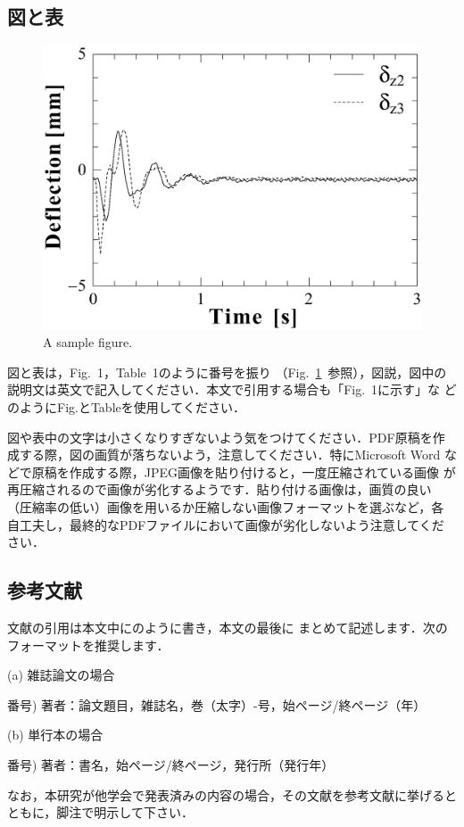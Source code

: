 \documentclass{jarticle}
\begin{document}
\subsection{図と表}

\begin{figure}[t]
  \centering
\ifLaTeXe
  \includegraphics[width=0.5\linewidth]{fig1}
\else
\fi
  \caption{A sample figure.}
  \label{fig:samplefig}
\end{figure}

図と表は，Fig.~1，Table~1のように番号を振り
（Fig.~\ref{fig:samplefig}\ 参照），図説，図中の
説明文は英文で記入してください．本文で引用する場合も「Fig.~1に示す」な
どのようにFig.とTableを使用してください．

図や表中の文字は小さくなりすぎないよう気をつけてください．PDF原稿を作
成する際，図の画質が落ちないよう，注意してください．特にMicrosoft Word
などで原稿を作成する際，JPEG画像を貼り付けると，一度圧縮されている画像
が再圧縮されるので画像が劣化するようです．貼り付ける画像は，画質の良い
（圧縮率の低い）画像を用いるか圧縮しない画像フォーマットを選ぶなど，各
自工夫し，最終的なPDFファイルにおいて画像が劣化しないよう注意してくだ
さい．

\subsection{参考文献}

文献の引用は本文中に\cite{大会ホームページ}のように書き，本文の最後に
まとめて記述します．次のフォーマットを推奨します．

\noindent
(a) 雑誌論文の場合

\noindent
番号)  著者：論文題目，雑誌名，巻（太字）-号，始ページ/終ページ（年）

\noindent
(b) 単行本の場合

\noindent
番号)  著者：書名，始ページ/終ページ，発行所（発行年）

なお，本研究が他学会で発表済みの内容の場合，その文献を参考文献に挙げるとともに，脚注で明示して下さい．
\end{document}
